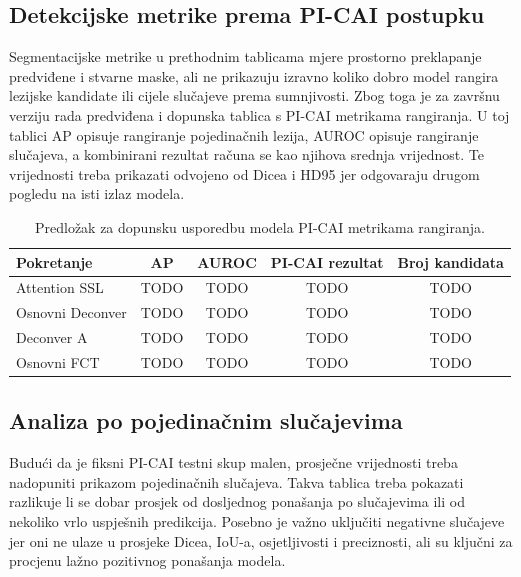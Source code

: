 \documentclass[a4paper,12pt,oneside]{article}
\begin{document}
\subsection{Detekcijske metrike prema PI-CAI postupku}

Segmentacijske metrike u prethodnim tablicama mjere prostorno preklapanje predviđene i stvarne maske, ali ne prikazuju izravno koliko dobro model rangira lezijske kandidate ili cijele slučajeve prema sumnjivosti. Zbog toga je za završnu verziju rada predviđena i dopunska tablica s PI-CAI metrikama rangiranja. U toj tablici AP opisuje rangiranje pojedinačnih lezija, AUROC opisuje rangiranje slučajeva, a kombinirani rezultat računa se kao njihova srednja vrijednost. Te vrijednosti treba prikazati odvojeno od Dicea i HD95 jer odgovaraju drugom pogledu na isti izlaz modela.

\begin{table}[H]
\centering
\caption{Predložak za dopunsku usporedbu modela PI-CAI metrikama rangiranja. \label{tab:picai_ranking_placeholder}}
\begin{tabular}{>{\raggedright\arraybackslash}p{} c c c c}
\toprule
Pokretanje & AP & AUROC & PI-CAI rezultat & Broj kandidata \\
\midrule
Attention SSL & TODO & TODO & TODO & TODO \\
Osnovni Deconver & TODO & TODO & TODO & TODO \\
Deconver A & TODO & TODO & TODO & TODO \\
Osnovni FCT & TODO & TODO & TODO & TODO \\
\bottomrule
\end{tabular}
\end{table}


\subsection{Analiza po pojedinačnim slučajevima}

Budući da je fiksni PI-CAI testni skup malen, prosječne vrijednosti treba nadopuniti prikazom pojedinačnih slučajeva. Takva tablica treba pokazati razlikuje li se dobar prosjek od dosljednog ponašanja po slučajevima ili od nekoliko vrlo uspješnih predikcija. Posebno je važno uključiti negativne slučajeve jer oni ne ulaze u prosjeke Dicea, IoU-a, osjetljivosti i preciznosti, ali su ključni za procjenu lažno pozitivnog ponašanja modela.
\end{document}

